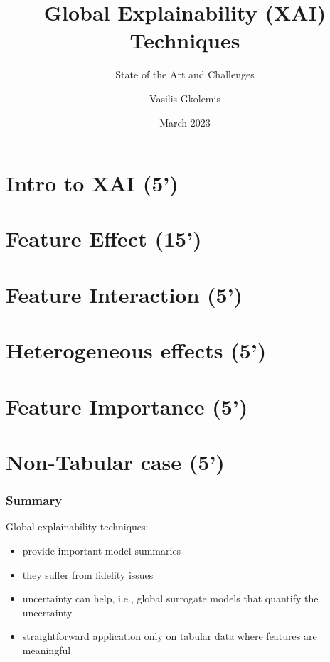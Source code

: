 \documentclass{beamer}
\title[FUB-Presentation]{Global Explainability (XAI) Techniques}
\subtitle{State of the Art and Challenges}
\author[Gkolemis, Vasilis] %
{Vasilis Gkolemis\inst{!}\inst{*}}
\institute[HUA] %
{
  \inst{!} ATHENA Research and Innovation Center \and
  \inst{*} Harokopio University of Athens
}
\date{March 2023}
\begin{document}
\frame{\titlepage}

\section[Intro to XAI]{Intro to XAI (5')}


\section[Feature Effect]{Feature Effect (15')}


\section[Feature Interaction]{Feature Interaction (5')}


\section[Heterogeneous effects]{Heterogeneous effects (5')}


\section[Feature Importance]{Feature Importance (5')}


\section[Non-Tabular case]{Non-Tabular case (5')}


\begin{frame}
    \frametitle{Summary}
    Global explainability techniques:
    \begin{itemize}
        \item provide important model summaries
        \item they suffer from fidelity issues
        \item uncertainty can help, i.e., global surrogate models that quantify the uncertainty
        \item straightforward application only on tabular data where features are meaningful
    \end{itemize}
\end{frame}
\end{document}
